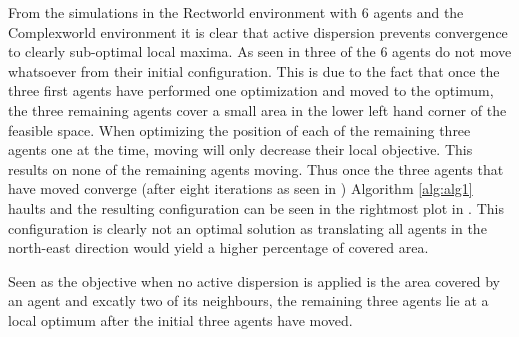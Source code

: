 From the simulations in the Rectworld environment with 6 agents and the Complexworld environment it is 
clear that active dispersion prevents convergence to clearly sub-optimal local maxima. As seen in  three of the 
6 agents do not move whatsoever from their initial configuration. This is due to the fact that once the three first agents have performed one optimization and moved to the 
optimum, the three remaining agents cover a small area in the lower left hand corner of the feasible space. When optimizing the position of each of the remaining three agents
one at the time, moving will only decrease their local objective. This results on none of the remaining agents moving. Thus once the three agents that have moved converge (after eight iterations as seen in ) Algorithm \ref{alg:alg1} haults and the resulting configuration 
can be seen in the rightmost plot in . This configuration is clearly not an optimal solution as translating all agents in the north-east direction would yield a higher 
percentage of covered area. 


Seen as the objective when no active dispersion is applied is the area covered
by an agent and excatly two of its neighbours, the remaining three agents lie at a local optimum after the initial three agents have moved.